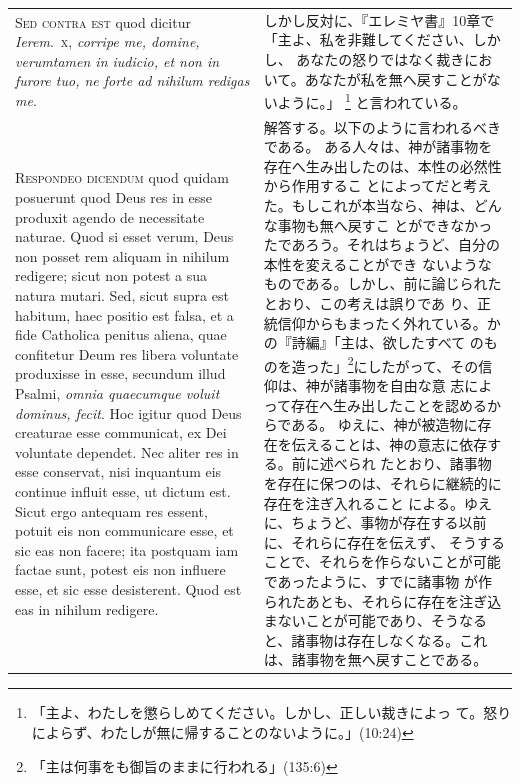 \documentclass[paper=a4paper,fontsize=10pt,jafontsize=9pt,titlepage]{jlreq}
\begin{document}
\begin{longtable}{p{21em}p{21em}}
\\


{\scshape  Sed contra est} quod dicitur {\itshape Ierem}.~{\scshape x},
{\itshape corripe me, domine, verumtamen in iudicio, et non in furore tuo, ne
forte ad nihilum redigas me}.

&

しかし反対に、『エレミヤ書』10章で「主よ、私を非難してください、しかし、
 あなたの怒りではなく裁きにおいて。あなたが私を無へ戻すことがないように。」
 \footnote{「主よ、わたしを懲らしめてください。しかし、正しい裁きによっ
 て。怒りによらず、わたしが無に帰することのないように。」(10:24)}
 と言われている。

\\


{\scshape Respondeo dicendum} quod quidam posuerunt quod
Deus res in esse produxit agendo de necessitate naturae. Quod si esset
verum, Deus non posset rem aliquam in nihilum redigere; sicut non potest
a sua natura mutari. Sed, sicut supra est habitum, haec positio est
falsa, et a fide Catholica penitus aliena, quae confitetur Deum res
libera voluntate produxisse in esse, secundum illud Psalmi, {\itshape omnia
quaecumque voluit dominus, fecit}. Hoc igitur quod Deus creaturae esse
communicat, ex Dei voluntate dependet. Nec aliter res in esse conservat,
nisi inquantum eis continue influit esse, ut dictum est. Sicut ergo
antequam res essent, potuit eis non communicare esse, et sic eas non
facere; ita postquam iam factae sunt, potest eis non influere esse, et
sic esse desisterent. Quod est eas in nihilum redigere.

&

解答する。以下のように言われるべきである。
ある人々は、神が諸事物を存在へ生み出したのは、本性の必然性から作用するこ
 とによってだと考えた。もしこれが本当なら、神は、どんな事物も無へ戻すこ
 とができなかったであろう。それはちょうど、自分の本性を変えることができ
 ないようなものである。しかし、前に論じられたとおり、この考えは誤りであ
 り、正統信仰からもまったく外れている。かの『詩編』「主は、欲したすべて
 のものを造った」\footnote{「主は何事をも御旨のままに行われる」(135:6)}にしたがって、その信仰は、神が諸事物を自由な意
 志によって存在へ生み出したことを認めるからである。
ゆえに、神が被造物に存在を伝えることは、神の意志に依存する。前に述べられ
 たとおり、諸事物を存在に保つのは、それらに継続的に存在を注ぎ入れること
 による。ゆえに、ちょうど、事物が存在する以前に、それらに存在を伝えず、
 そうすることで、それらを作らないことが可能であったように、すでに諸事物
 が作られたあとも、それらに存在を注ぎ込まないことが可能であり、そうなる
 と、諸事物は存在しなくなる。これは、諸事物を無へ戻すことである。


\end{longtable}
\end{document}
